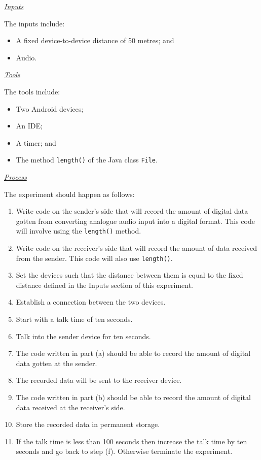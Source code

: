 \documentclass[12pt,svgnames,smaller]{article} %
\begin{document}
\begin{enumerate}
\begin{enumerate}
			\textsf{\underline{\emph{Inputs}}}
			
			The inputs include:
			
			\begin{itemize}
				\item A fixed device-to-device distance of 50 metres; and
				\item Audio.
			\end{itemize}
			
			\emph{\underline{\textsf{Tools}}}
			
			The tools include:
			
			\begin{itemize}
				\item Two Android devices; 
				\item An IDE;
				\item A timer; and
				\item The method \texttt{length()} of the Java class \texttt{File}. 
			\end{itemize}
			
			\emph{\underline{\textsf{Process}}}
			
			The experiment should happen as follows:
			
			\begin{enumerate}
				\item Write code on the sender’s side that will record the amount of digital data gotten from converting analogue audio input into a digital format. This code will involve using the \texttt{length()} method.
				\item Write code on the receiver’s side that will record the amount of data received from the sender. This code will also use \texttt{length()}.
				\item Set the devices such that the distance between them is equal to the fixed distance defined in the Inputs section of this experiment.
				\item Establish a connection between the two devices.
				\item Start with a talk time of ten seconds.
				\item Talk into the sender device for ten seconds. 
				\item The code written in part (a) should be able to record the amount of digital data gotten at the sender.
				\item The recorded data will be sent to the receiver device.
				\item The code written in part (b) should be able to record the amount of digital data received at the receiver’s side.
				\item Store the recorded data in permanent storage.
				\item If the talk time is less than 100 seconds then increase the talk time by ten seconds and go back to step (f). Otherwise terminate the experiment. 
				

\end{enumerate}
\end{enumerate}
\end{enumerate}
\end{document}
